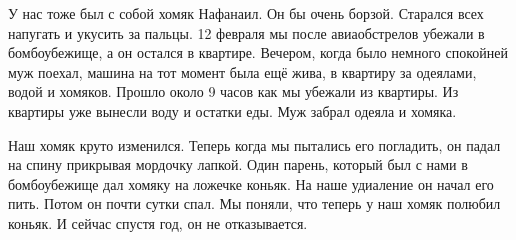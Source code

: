  
 
 
 
 

\qqSecCmt


У нас тоже был с собой хомяк Нафанаил. Он бы очень борзой. Старался всех
напугать и укусить за пальцы. 12 февраля мы после авиаобстрелов убежали в
бомбоубежище, а он остался в квартире. Вечером, когда было немного спокойней
муж поехал, машина на тот момент была ещё жива, в квартиру за одеялами, водой и
хомяков. Прошло около 9 часов как мы убежали из квартиры. Из квартиры уже
вынесли воду и остатки еды. Муж забрал одеяла и хомяка.

Наш хомяк круто изменился. Теперь когда мы пытались его погладить, он падал на
спину прикрывая мордочку лапкой. Один парень, который был с нами в бомбоубежище
дал хомяку на ложечке коньяк. На наше удиаление он начал его пить. Потом он
почти сутки спал. Мы поняли, что теперь у наш хомяк полюбил коньяк. И сейчас
спустя год, он не отказывается.
